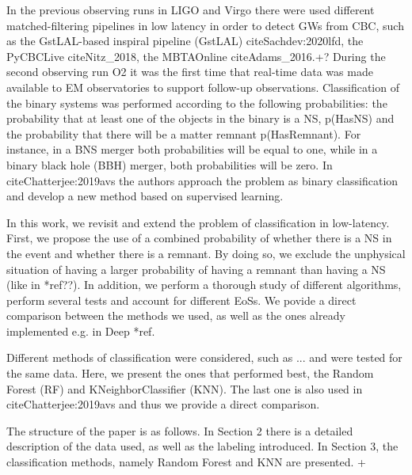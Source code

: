 
   
 
In the previous observing runs in LIGO and Virgo there were used different matched-filtering pipelines in low latency in order to detect GWs from CBC, such as the GstLAL-based inspiral pipeline (GstLAL) cite{Sachdev:2020lfd}, the PyCBCLive cite{Nitz_2018}, the MBTAOnline cite{Adams_2016}.+? During the second observing run O2 it was the first time that real-time data was made available to EM observatories to support follow-up observations. Classification of the binary systems was performed according to the following probabilities: the probability that at least one of the objects in the binary is a NS, p(HasNS) and the probability that there will be a matter remnant p(HasRemnant). For instance, in a BNS merger both probabilities will be equal to one, while in a binary black hole (BBH) merger, both probabilities will be zero. In cite{Chatterjee:2019avs} the authors approach the problem as binary classification and develop a new method based on supervised learning. 


In this work, we revisit and extend the problem of classification in low-latency. First, we propose the use of a combined probability of whether there is a NS in the event and whether there is a remnant. By doing so, we exclude the unphysical situation of having a larger probability of having a remnant than having a NS (like in *ref??). In addition, we perform a thorough study of different algorithms, perform several tests and account for different EoSs. We povide a direct comparison between the methods we used, as well as the ones already implemented e.g. in Deep *ref. 

Different methods of classification were considered, such as ... and were tested for the same data. Here, we present the ones that performed best, the Random Forest (RF) and KNeighborClassifier (KNN). The last one is also used in cite{Chatterjee:2019avs} and thus we provide a direct comparison. 

The structure of the paper is as follows. In Section 2 there is a detailed description of the data used, as well as the labeling introduced. In Section 3, the classification methods, namely Random Forest and KNN are presented. +   
